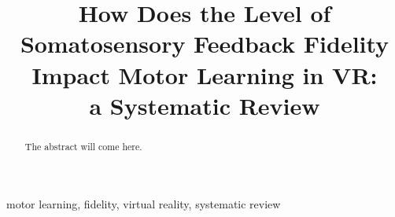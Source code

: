 \documentclass[conference]{IEEEtran}
\begin{document}
\title{How Does the Level of Somatosensory Feedback Fidelity Impact Motor Learning in VR: \\a Systematic Review}

\author{
\and
{}
\and
{}
}

\maketitle

\begin{abstract}
The abstract will come here.
\end{abstract}

\begin{IEEEkeywords}
motor learning, fidelity, virtual reality, systematic review
\end{IEEEkeywords}









\twocolumn


\end{document}
